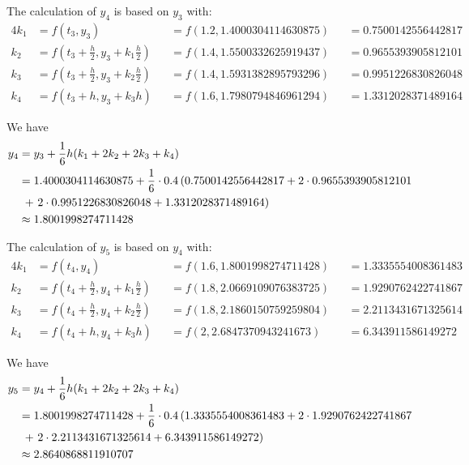\documentclass[a4paper]{article}
\begin{document}
The calculation of \(y_4\) is based on \(y_3\) with:
\begin{alignat*}{4}
  k_1 & = f(t_3, y_3)                                            &  & = f(1.2, 1.4000304114630875) &  & = 0.7500142556442817 \\
  k_2 & = f \left(t_3 + \frac{h}{2}, y_3 + k_1\frac{h}{2}\right) &  & = f(1.4, 1.5500332625919437) &  & = 0.9655393905812101 \\
  k_3 & = f \left(t_3 + \frac{h}{2}, y_3 + k_2\frac{h}{2}\right) &  & = f(1.4, 1.5931382895793296) &  & = 0.9951226830826048 \\
  k_4 & = f(t_3 + h, y_3 + k_3h)                                 &  & = f(1.6, 1.7980794846961294) &  & = 1.3312028371489164
\end{alignat*}

We have
\begin{align*}
  y_4 & = y_3 + \frac{1}{6}h(k_1 + 2k_2 + 2k_3 + k_4)                                                            \\
      & = 1.4000304114630875 + \frac{1}{6} \cdot 0.4\left(0.7500142556442817 + 2 \cdot 0.9655393905812101\right. \\
      & \;\left.+\ 2 \cdot 0.9951226830826048 + 1.3312028371489164\vphantom{1}\right)                            \\
      & \approx 1.8001998274711428
\end{align*}

The calculation of \(y_5\) is based on \(y_4\) with:
\begin{alignat*}{4}
  k_1 & = f(t_4, y_4)                                            &  & = f(1.6, 1.8001998274711428) &  & = 1.3335554008361483 \\
  k_2 & = f \left(t_4 + \frac{h}{2}, y_4 + k_1\frac{h}{2}\right) &  & = f(1.8, 2.0669109076383725) &  & = 1.9290762422741867 \\
  k_3 & = f \left(t_4 + \frac{h}{2}, y_4 + k_2\frac{h}{2}\right) &  & = f(1.8, 2.1860150759259804) &  & = 2.2113431671325614 \\
  k_4 & = f(t_4 + h, y_4 + k_3h)                                 &  & = f(2, 2.6847370943241673)   &  & = 6.343911586149272
\end{alignat*}

We have
\begin{align*}
  y_5 & = y_4 + \frac{1}{6}h(k_1 + 2k_2 + 2k_3 + k_4)                                                            \\
      & = 1.8001998274711428 + \frac{1}{6} \cdot 0.4\left(1.3335554008361483 + 2 \cdot 1.9290762422741867\right. \\
      & \;\left.+\ 2 \cdot 2.2113431671325614 + 6.343911586149272\vphantom{1}\right)                             \\
      & \approx 2.8640868811910707
\end{align*}
\end{document}
